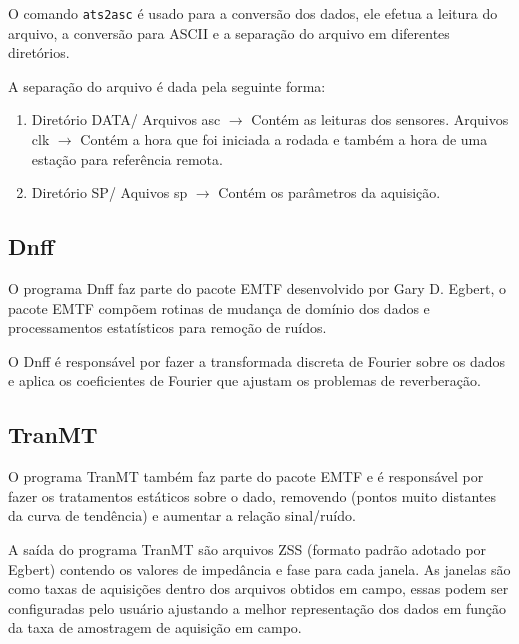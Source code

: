     O comando \verb|ats2asc| \cite{emtf} é usado para a conversão dos dados, ele efetua a leitura do arquivo, a conversão para ASCII e a separação do arquivo em diferentes diretórios.
    
    A separação do arquivo é dada pela seguinte forma:
    
    \begin{enumerate}
     \item Diretório DATA/ 
     \subitem Arquivos asc $\rightarrow$ Contém as leituras dos sensores.
     \subitem Arquivos clk $\rightarrow$ Contém a hora que foi iniciada a rodada e também a hora de uma estação para referência remota.
     \item Diretório SP/
     \subitem Aquivos sp $\rightarrow$ Contém os parâmetros da aquisição.
    \end{enumerate}

    
    \subsection{Dnff}
    
            O programa Dnff faz parte do pacote EMTF \cite{emtf} desenvolvido por Gary D. Egbert, o pacote EMTF compõem rotinas de mudança de domínio dos dados e processamentos estatísticos para remoção de ruídos.
            
            O Dnff é responsável por fazer a transformada discreta de Fourier sobre os dados e aplica os coeficientes de Fourier que ajustam os problemas de reverberação.

    \subsection{TranMT}
    
            O programa TranMT também faz parte do pacote EMTF e é responsável por fazer os tratamentos estáticos sobre o dado, removendo  (pontos muito distantes da curva de tendência) e aumentar a relação sinal/ruído.
            
            A saída do programa TranMT são arquivos ZSS (formato padrão adotado por Egbert) contendo os valores de impedância e fase para cada janela. As janelas são como taxas de aquisições dentro dos arquivos obtidos em campo, essas podem ser configuradas pelo usuário ajustando a melhor representação dos dados em função da taxa de amostragem de aquisição em campo.   
            
